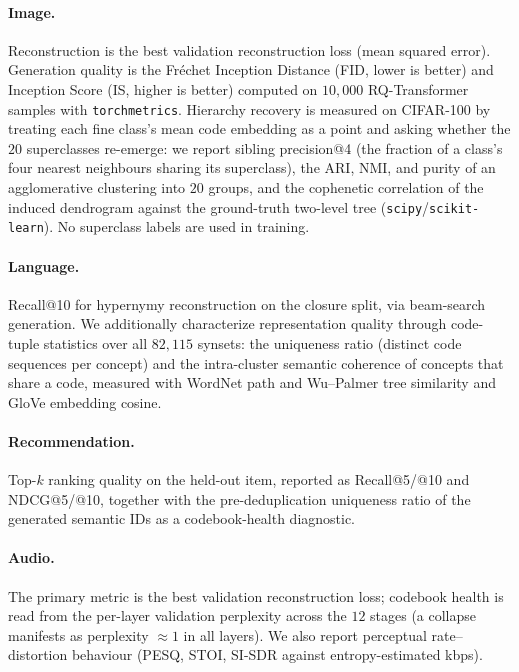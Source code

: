 \documentclass[12pt]{report}
\begin{document}
\paragraph{Image.} Reconstruction is the best validation reconstruction loss (mean squared error). Generation quality is the Fr\'echet Inception Distance (FID, lower is better) and Inception Score (IS, higher is better) computed on $10{,}000$ RQ-Transformer samples with \texttt{torchmetrics}. Hierarchy recovery is measured on CIFAR-100 by treating each fine class's mean code embedding as a point and asking whether the $20$ superclasses re-emerge: we report sibling precision@4 (the fraction of a class's four nearest neighbours sharing its superclass), the ARI, NMI, and purity of an agglomerative clustering into $20$ groups, and the cophenetic correlation of the induced dendrogram against the ground-truth two-level tree (\texttt{scipy}/\texttt{scikit-learn}). No superclass labels are used in training.

\paragraph{Language.} Recall@10 for hypernymy reconstruction on the closure split, via beam-search generation. We additionally characterize representation quality through code-tuple statistics over all $82{,}115$ synsets: the uniqueness ratio (distinct code sequences per concept) and the intra-cluster semantic coherence of concepts that share a code, measured with WordNet path and Wu--Palmer tree similarity and GloVe embedding cosine.

\paragraph{Recommendation.} Top-$k$ ranking quality on the held-out item, reported as Recall@5/@10 and NDCG@5/@10, together with the pre-deduplication uniqueness ratio of the generated semantic IDs as a codebook-health diagnostic.

\paragraph{Audio.} The primary metric is the best validation reconstruction loss; codebook health is read from the per-layer validation perplexity across the $12$ stages (a collapse manifests as perplexity $\approx 1$ in all layers). We also report perceptual rate--distortion behaviour (PESQ, STOI, SI-SDR against entropy-estimated kbps).
\end{document}
